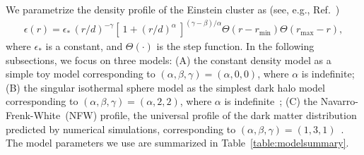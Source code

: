 \documentclass[aps,11pt,nofootinbib,preprintnumbers,groupedaddress,superscriptaddress]{revtex4-2}
\begin{document}
We parametrize the density profile of the Einstein cluster as (see, e.g., Ref.~\cite{Hernquist:1990be})
\begin{align}
\epsilon(r)=\epsilon_* \, (r/d)^{-\gamma} \left[\:\!
1+(r/d)^\alpha
\:\!\right]^{(\gamma-\beta)/\alpha}
\Theta(r-r_{\mathrm{min}})\Theta(r_{\mathrm{max}}-r),
\end{align}
where 
$\epsilon_*$ is a constant, and 
$\Theta(\cdot)$ is the step function. 
In the following subsections, we focus on three models:  
(A) the constant density model as a simple toy model corresponding to $(\alpha, \beta, \gamma)=(\alpha, 0, 0)$, where $\alpha$ is indefinite; 
(B) the singular isothermal sphere model as the simplest dark halo model 
corresponding to 
$(\alpha, \beta, \gamma)=(\alpha, 2, 2)$, where $\alpha$ is indefinite~\cite{Binney:2008};
(C) the Navarro-Frenk-White~(NFW) profile, 
the universal profile of the dark matter distribution predicted by numerical simulations,   corresponding to 
 $(\alpha, \beta, \gamma)=(1, 3, 1)$~\cite{Navarro:1995iw}. 
The model parameters we use are summarized in Table~\ref{table:modelsummary}.
\end{document}
